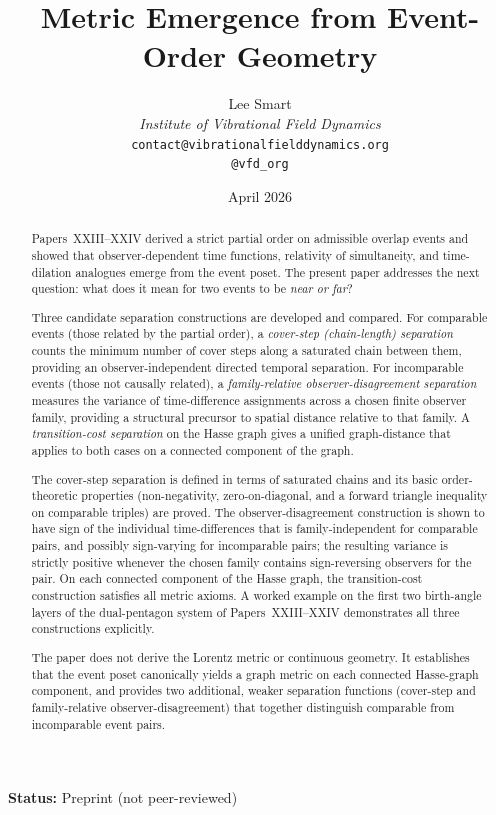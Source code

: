 \documentclass[12pt]{article}
\title{Metric Emergence from Event-Order Geometry}
\author{%
  Lee Smart\\[4pt]
  \textit{Institute of Vibrational Field Dynamics}\\[2pt]
  \texttt{contact@vibrationalfielddynamics.org}\\[2pt]
  \texttt{@vfd\_org}%
}
\date{April 2026}
\begin{document}
\maketitle

\noindent\textbf{Status:} Preprint (not peer-reviewed)

\begin{abstract}
Papers~XXIII--XXIV derived a strict partial order on admissible overlap events and showed that observer-dependent time functions, relativity of simultaneity, and time-dilation analogues emerge from the event poset. The present paper addresses the next question: what does it mean for two events to be \textit{near or far}?

Three candidate separation constructions are developed and compared. For comparable events (those related by the partial order), a \textit{cover-step (chain-length) separation} counts the minimum number of cover steps along a saturated chain between them, providing an observer-independent directed temporal separation. For incomparable events (those not causally related), a \textit{family-relative observer-disagreement separation} measures the variance of time-difference assignments across a chosen finite observer family, providing a structural precursor to spatial distance relative to that family. A \textit{transition-cost separation} on the Hasse graph gives a unified graph-distance that applies to both cases on a connected component of the graph.

The cover-step separation is defined in terms of saturated chains and its basic order-theoretic properties (non-negativity, zero-on-diagonal, and a forward triangle inequality on comparable triples) are proved. The observer-disagreement construction is shown to have sign of the individual time-differences that is family-independent for comparable pairs, and possibly sign-varying for incomparable pairs; the resulting variance is strictly positive whenever the chosen family contains sign-reversing observers for the pair. On each connected component of the Hasse graph, the transition-cost construction satisfies all metric axioms. A worked example on the first two birth-angle layers of the dual-pentagon system of Papers~XXIII--XXIV demonstrates all three constructions explicitly.

The paper does not derive the Lorentz metric or continuous geometry. It establishes that the event poset canonically yields a graph metric on each connected Hasse-graph component, and provides two additional, weaker separation functions (cover-step and family-relative observer-disagreement) that together distinguish comparable from incomparable event pairs.
\end{abstract}
\end{document}
